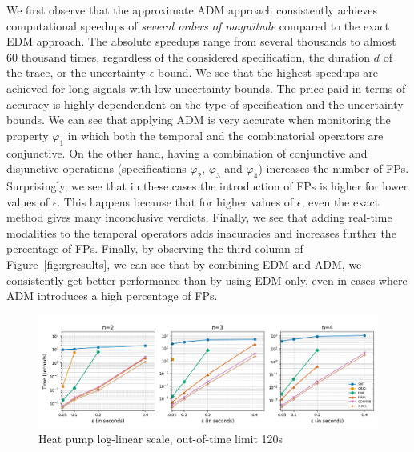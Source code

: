 We first observe that the approximate ADM approach consistently achieves computational speedups of \emph{several orders of magnitude} 
compared to the exact EDM approach. The absolute speedups range from several thousands to almost 60 thousand times, regardless of the considered specification, the duration $d$ of the trace, or the uncertainty $\epsilon$ bound. We see that the highest speedups are achieved for long signals with low uncertainty bounds. The price paid in terms of accuracy is highly dependendent on the type of specification and the uncertainty bounds. We can see that applying ADM is very accurate when monitoring the property 
$\varphi_1$ in which both the temporal and the combinatorial operators are conjunctive. On the other hand, having a combination of conjunctive and disjunctive operations (specifications $\varphi_{2}$, $\varphi_{3}$ and $\varphi_{4}$) increases the number of FPs.  Surprisingly, we see that in these cases the introduction of FPs is higher for lower values of $\epsilon$. This happens because that for higher values of $\epsilon$,  even the exact method gives many inconclusive verdicts. Finally, we see that adding real-time modalities to the temporal operators adds inacuracies and increases further the percentage of FPs. Finally, by observing the third column of Figure~\ref{fig:rgresults}, we can see that by combining EDM and ADM, we consistently get better performance than by using EDM only, even in cases where ADM introduces a high percentage of FPs.


\begin{figure}[htb]
	\begin{center}
		\includegraphics[width=\linewidth]{wtlin.png}
		\caption{Heat pump log-linear scale, out-of-time limit 120s}
	\end{center}
\end{figure}

